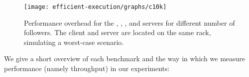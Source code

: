 

\begin{figure}[!t]
 \centering
 \texttt{[image: efficient-execution/graphs/c10k]}
 \caption{Performance overhead for the \beanstalkd, \lighttpd, \memcached, \nginx
   and \redis servers for different number of followers.  The client
   and server are located on the same rack, simulating a worst-case scenario.}
 \label{fig:servers}
\end{figure}


We give a short overview of each benchmark and the way in which we
measure performance (namely throughput) in our experiments:

